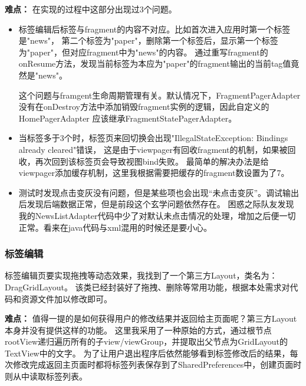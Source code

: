 \documentclass[UTF8]{article}
\begin{document}
\textbf{\heiti 难点：}
在实现的过程中这部分出现过3个问题。

\begin{itemize}
    \item {
        标签编辑后标签与fragment的内容不对应。比如首次进入应用时第一个标签是"news"，
        第二个标签为"paper"，删除第一个标签后，显示第一个标签为"paper"，但对应fragment中为"news"的内容。
        通过重写fragment的onResume方法，发现当前标签为本应为"paper"的fragment输出的当前tag值竟然是"news"。
        
        这个问题与framgent生命周期管理有关。默认情况下，FragmentPagerAdapter没有在onDestroy方法中添加销毁fragment实例的逻辑，因此自定义的HomePagerAdapter
        应该继承FragmentStatePagerAdapter。
    }
    \item {
        当标签多于3个时，标签页来回切换会出现"IllegalStateException: Bindings already cleared"错误，
        这是由于viewpager有回收fragment的机制，如果被回收，再次回到该标签页会导致视图bind失败。
        最简单的解决办法是给viewpager添加缓存机制，这里我根据需要把缓存的fragment数设置为了7。
    }

    \item {
        测试时发现点击变灰没有问题，但是某些项也会出现“未点击变灰”。调试输出后发现后端数据正常，但是前段这个玄学问题依然存在。
        困惑之际队友发现我的NewsListAdapter代码中少了对默认未点击情况的处理，增加之后便一切正常。看来在java代码与xml混用的时候还是要小心。
    }
\end{itemize}

\subsubsection{标签编辑}
标签编辑页要实现拖拽等动态效果，我找到了一个第三方Layout，类名为：DragGridLayout。
该类已经封装好了拖拽、删除等常用功能，根据本处需求对代码和资源文件加以修改即可。

\textbf{\heiti 难点：}
值得一提的是如何获得用户的修改结果并返回给主页面呢？第三方Layout本身并没有提供这样的功能。
这里我采用了一种原始的方式，通过根节点rootView递归遍历所有的子view/viewGroup，并提取出父节点为GridLayout的TextView中的文字。
为了让用户退出程序后依然能够看到标签修改后的结果，每次修改完成返回主页面时都将标签列表保存到了SharedPreferences中，创建页面时则从中读取标签列表。
\end{document}

